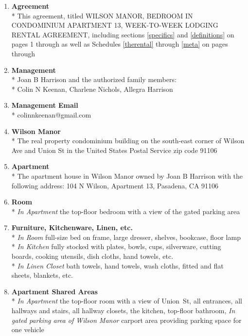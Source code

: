 \documentclass[]{article}
\newcommand{\agreementtitle}{WILSON MANOR, BEDROOM IN CONDOMINIUM APARTMENT 13, WEEK-TO-WEEK LODGING RENTAL AGREEMENT}
\newcommand{\agreementdef}{agreement, titled \agreementtitle{}, including sections \ref{specifics} and \ref{definitions} on pages 1 through \pageref{acceptance} as well as Schedules \ref{therental} through \ref{meta} on pages \pageref{therental} through \pageref{LastPage}}
\newcommand{\mom}{Joan B Harrison}
\newcommand{\management}{Management}
\newcommand{\myemail}{Management Email}
\newcommand{\condo}{Wilson Manor}
\newcommand{\apt}{Apartment}
\newcommand{\room}{Room}
\newcommand{\furniture}{Furniture, Kitchenware, Linen, etc.}
\newcommand{\shared}{Apartment Shared Areas}
\begin{document}
\begin{multicols}{2}
	\begin{enumerate} 
		\item \textbf{Agreement}\\* \label{agreement}
			This \agreementdef{}

		\item \textbf{\management{}}\\* \label{management}
			\noindent \mom{}
			and the authorized family members:\\*
			Colin N Keenan,
			Charlene Nichols,
			Allegra Harrison

		\item \textbf{\myemail{}}\\* \label{myemail}
			colinnkeenan@gmail.com

		\item \textbf{\condo{}}\\* \label{condo}
			The real property condominium building on the south-east corner of Wilson Ave and Union St in the United States Postal Service zip code 91106

		\item \textbf{\apt{}}\\* \label{apt}
			The apartment house in \condo{} owned by \mom{} with the following address:
			104 N Wilson, \apt{} 13,
			Pasadena, CA  91106

		\item \textbf{\room{}}\\* \label{room}
			\textit{In \apt{}}
			the top-floor bedroom with a view of the gated parking area

		\item \textbf{\furniture{}}\\* \label{furniture}
			\textit{In \room{}}
			full-size bed on frame, large dresser, shelves, bookcase, floor lamp\\*
			\textit{In Kitchen}
			fully stocked with plates, bowls, cups, silverware, cutting boards, cooking utensils, dish cloths, hand towels, etc.\\*
			\textit{In Linen Closet}
			bath towels, hand towels, wash cloths, fitted and flat sheets, blankets, etc.

		\item \textbf{\shared{}}\\* \label{shared}
			\textit{In \apt{}}
			the top-floor room with a view of Union~St,
			all entrances,
			all hallways and stairs,
			all hallway closets,
			the kitchen,
			top-floor bathroom,
			\textit{In gated parking area of \condo{}}
			carport area providing parking space for one vehicle
			

\end{enumerate}
\end{multicols}
\end{document}

